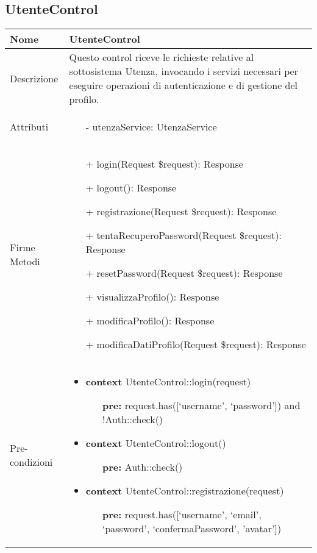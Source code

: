 \subsection{UtenteControl}
\small\begin{tabular}{|| l | p{28em} ||} 
	\hline
	Nome & UtenteControl\\
	\hline
	Descrizione & Questo control riceve le richieste relative al sottosistema Utenza, invocando i servizi necessari per eseguire operazioni di autenticazione e di gestione del profilo. \\
	\hline
	Attributi & \begin{itemize}
		\item[-] utenzaService: UtenzaService
	\end{itemize}\\
	\hline
	Firme Metodi & \begin{itemize}
		\item[+] login(Request \$request): Response
		\item[+] logout(): Response
		\item[+] registrazione(Request \$request): Response
		\item[+] tentaRecuperoPassword(Request \$request): Response
		\item[+] resetPassword(Request \$request): Response
		\item[+] visualizzaProfilo(): Response
		\item[+] modificaProfilo(): Response
		\item[+] modificaDatiProfilo(Request \$request): Response
	\end{itemize}\\
	\hline
	Pre-condizioni & \begin{itemize}
		\item \textbf{context} UtenteControl::login(request)
		\begin{itemize}
			\item[ ] \textbf{pre:} request.has([‘username’, ‘password’]) and !Auth::check()
		\end{itemize}
	  
	    \item \textbf{context} UtenteControl::logout()
		\begin{itemize}
			\item[ ] \textbf{pre:} Auth::check()
		\end{itemize} 
	  
	    \item \textbf{context} UtenteControl::registrazione(request) 
		\begin{itemize}
			\item[ ] \textbf{pre:} request.has([‘username’, ‘email’, ‘password’, ‘confermaPassword’, 'avatar'])
		\end{itemize} 
	  

\end{itemize}
\end{tabular}
